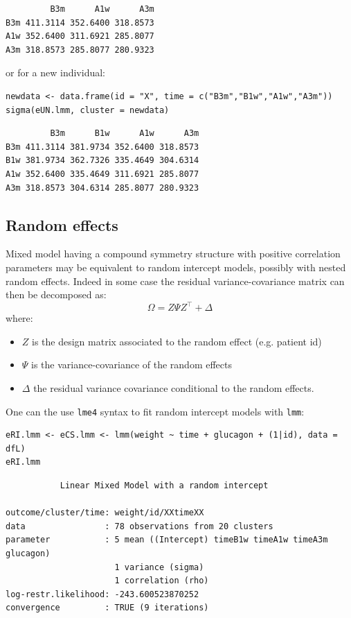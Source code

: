 \documentclass[12pt]{article}
\newcommand\trans[1]{{#1}^\intercal}%
\begin{document}
\begin{verbatim}
         B3m      A1w      A3m
B3m 411.3114 352.6400 318.8573
A1w 352.6400 311.6921 285.8077
A3m 318.8573 285.8077 280.9323
\end{verbatim}


or for a new individual:
\lstset{language=r,label= ,caption= ,captionpos=b,numbers=none}
\begin{lstlisting}
newdata <- data.frame(id = "X", time = c("B3m","B1w","A1w","A3m"))
sigma(eUN.lmm, cluster = newdata)
\end{lstlisting}

\begin{verbatim}
         B3m      B1w      A1w      A3m
B3m 411.3114 381.9734 352.6400 318.8573
B1w 381.9734 362.7326 335.4649 304.6314
A1w 352.6400 335.4649 311.6921 285.8077
A3m 318.8573 304.6314 285.8077 280.9323
\end{verbatim}

\subsection{Random effects}
\label{sec:org3617207}

Mixed model having a compound symmetry structure with positive
correlation parameters may be equivalent to random intercept models,
possibly with nested random effects. Indeed in some case the residual
variance-covariance matrix can then be decomposed as:
\[ \Omega = Z \Psi \trans{Z} + \Delta \]
where:
\begin{itemize}
\item \(Z\) is the design matrix associated to the random effect (e.g. patient id)
\item \(\Psi\) is the variance-covariance of the random effects
\item \(\Delta\) the residual variance covariance conditional to the random effects.
\end{itemize}
One can the use \texttt{lme4} syntax to fit random intercept models with
\texttt{lmm}:
\lstset{language=r,label= ,caption= ,captionpos=b,numbers=none}
\begin{lstlisting}
eRI.lmm <- eCS.lmm <- lmm(weight ~ time + glucagon + (1|id), data = dfL)
eRI.lmm
\end{lstlisting}

\begin{verbatim}
	       Linear Mixed Model with a random intercept 

outcome/cluster/time: weight/id/XXtimeXX 
data                : 78 observations from 20 clusters 
parameter           : 5 mean ((Intercept) timeB1w timeA1w timeA3m glucagon) 
                      1 variance (sigma) 
                      1 correlation (rho) 
log-restr.likelihood: -243.600523870252 
convergence         : TRUE (9 iterations)
\end{verbatim}
\end{document}
